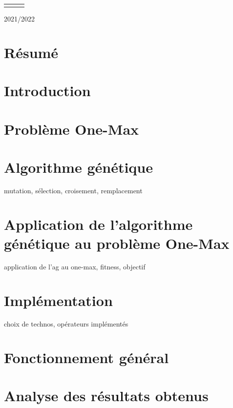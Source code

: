 \documentclass[12pt]{article}
\begin{document}
\begin{table}[H]
\begin{tabular}{lll}
&&\\

\end{tabular}

\end{table}

\begin{center}
2021/2022
\end{center}


\newpage
\renewcommand\headrulewidth{1 pt}\fancyhead[L]{}\fancyhead[C]{} 
\setcounter{page}{1}

\section{Résumé}
\section{Introduction}
\section{Problème One-Max}
\section{Algorithme génétique}
\par mutation, sélection, croisement, remplacement
\section{Application de l'algorithme génétique au problème One-Max}
\par application de l'ag au one-max, fitness, objectif
\section{Implémentation}
\par choix de technos, opérateurs implémentés
\section{Fonctionnement général}
\section{Analyse des résultats obtenus}
\end{document}
